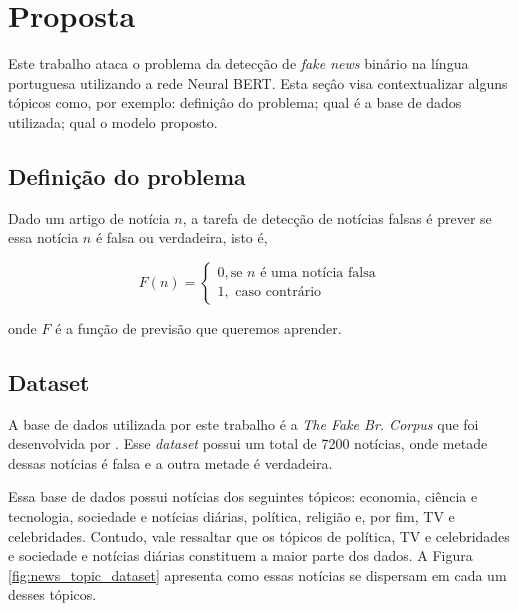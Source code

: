 \section{Proposta}


Este trabalho ataca o problema da detecção de \textit{fake news} binário na língua portuguesa utilizando a rede Neural BERT. Esta seçâo visa contextualizar alguns tópicos como, por exemplo: definiçâo do problema; qual é a base de dados utilizada; qual o modelo proposto.






\subsection{Definição do problema}

Dado um artigo de notícia $n$, a tarefa de detecção de notícias falsas é prever se essa notícia $n$ é falsa ou verdadeira, isto é,

\begin{equation}
    F(n) =  \begin{cases}
    		0  , \textrm{se } n \textrm{ é uma notícia falsa} \\
    		1 , \textrm{ caso contrário}
    	\end{cases}
\end{equation}

onde $F$ é a função de previsão que queremos aprender.

\subsection{Dataset}

A base de dados utilizada por este trabalho é a \textit{The Fake Br. Corpus}  que foi desenvolvida por \citet{Silva2020}. Esse \textit{dataset} possui um total de 7200 notícias, onde metade dessas notícias é falsa e a outra metade é verdadeira. 

Essa base de dados possui notícias dos seguintes tópicos: economia, ciência e tecnologia, sociedade e notícias diárias, política, religião e, por fim, TV e celebridades. Contudo, vale ressaltar que os tópicos de política, TV e celebridades e sociedade e notícias diárias constituem a maior parte dos dados. A Figura \ref{fig:news_topic_dataset} apresenta como essas notícias se dispersam em cada um desses tópicos. 


